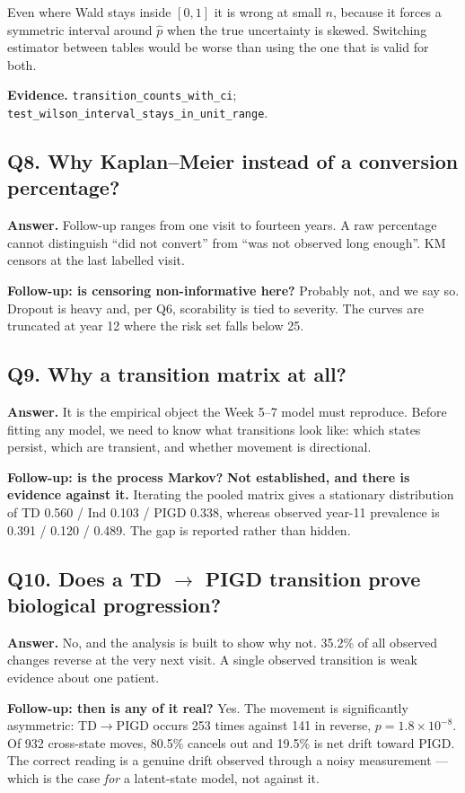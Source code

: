 \documentclass[11pt,a4paper]{article}
\newcommand{\code}[1]{\texttt{\small #1}}
\newcommand{\arr}{$\rightarrow$}
\begin{document}
Even where Wald stays inside $[0,1]$ it is wrong at small $n$, because it
forces a symmetric interval around $\hat p$ when the true uncertainty is
skewed. Switching estimator between tables would be worse than using the one
that is valid for both.

\textbf{Evidence.} \code{transition\_counts\_with\_ci};
\code{test\_wilson\_interval\_stays\_in\_unit\_range}.

\subsection*{Q8. Why Kaplan--Meier instead of a conversion percentage?}
\textbf{Answer.} Follow-up ranges from one visit to fourteen years. A raw
percentage cannot distinguish ``did not convert'' from ``was not observed long
enough''. KM censors at the last labelled visit.

\textbf{Follow-up: is censoring non-informative here?} Probably not, and we say
so. Dropout is heavy and, per Q6, scorability is tied to severity. The curves
are truncated at year 12 where the risk set falls below 25.

\subsection*{Q9. Why a transition matrix at all?}
\textbf{Answer.} It is the empirical object the Week 5--7 model must reproduce.
Before fitting any model, we need to know what transitions look like: which
states persist, which are transient, and whether movement is directional.

\textbf{Follow-up: is the process Markov?} \textbf{Not established, and there
is evidence against it.} Iterating the pooled matrix gives a stationary
distribution of TD 0.560 / Ind 0.103 / PIGD 0.338, whereas observed year-11
prevalence is 0.391 / 0.120 / 0.489. The gap is reported rather than hidden.

\subsection*{Q10. Does a TD $\rightarrow$ PIGD transition prove biological progression?}
\textbf{Answer.} No, and the analysis is built to show why not. 35.2\% of all
observed changes reverse at the very next visit. A single observed transition
is weak evidence about one patient.

\textbf{Follow-up: then is any of it real?} Yes. The movement is significantly
asymmetric: TD\arr PIGD occurs 253 times against 141 in reverse,
$p = 1.8\times10^{-8}$. Of 932 cross-state moves, 80.5\% cancels out and 19.5\%
is net drift toward PIGD. The correct reading is a genuine drift observed
through a noisy measurement --- which is the case \emph{for} a latent-state
model, not against it.
\end{document}
